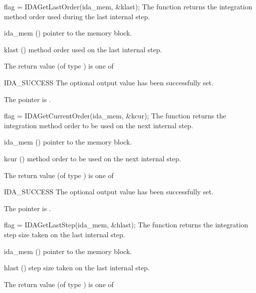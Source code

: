{{}
{}
{
  flag = IDAGetLastOrder(ida\_mem, \&klast);
}
{
  The function  returns the
  integration method order used during the last internal step.
}
{
  \begin{args}
  \item[ida\_mem] ()
    pointer to the {\ida} memory block.
  \item[klast] ()
    method order used on the last internal step.
  \end{args}
}
{
  The return value  (of type ) is one of
  \begin{args}
  \item[IDA\_SUCCESS] 
    The optional output value has been successfully set.
  \item[\Id{IDA\_MEM\_NULL}]
    The  pointer is .
  \end{args}
}
{}
{
  flag = IDAGetCurrentOrder(ida\_mem, \&kcur);
}
{
  The function  returns the
  integration method order to be used on the next internal step.
}
{
  \begin{args}
  \item[ida\_mem] ()
    pointer to the {\ida} memory block.
  \item[kcur] ()
    method order to be used on the next internal step.
  \end{args}
}
{
  The return value  (of type ) is one of
  \begin{args}
  \item[IDA\_SUCCESS] 
    The optional output value has been successfully set.
  \item[\Id{IDA\_MEM\_NULL}]
    The  pointer is .
  \end{args}
}
{}
{
  flag = IDAGetLastStep(ida\_mem, \&hlast);
}
{
  The function  returns the
  integration step size taken on the last internal step.
}
{
  \begin{args}
  \item[ida\_mem] ()
    pointer to the {\ida} memory block.
  \item[hlast] ()
    step size taken on the last internal step.
  \end{args}
}
{
  The return value  (of type ) is one of
  \begin{args}

\end{args}}}
